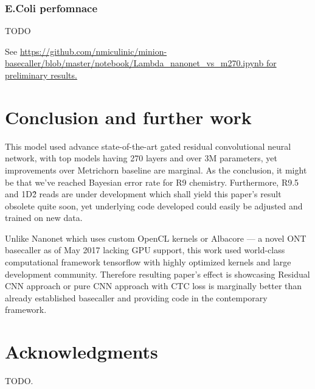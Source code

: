 \documentclass[times, utf8, seminar, numeric]{fer}
\begin{document}
\subsection{E.Coli perfomnace}

TODO

See \url{https://github.com/nmiculinic/minion-basecaller/blob/master/notebook/Lambda_nanonet_vs_m270.ipynb for preliminary results.}

\chapter{Conclusion and further work}

This model used advance state-of-the-art gated residual convolutional neural network, with top models having 270 layers and over 3M parameters, yet improvements over Metrichorn baseline are marginal. As the conclusion, it might be that we've reached Bayesian error rate for R9 chemistry. Furthermore, R9.5 and 1D\^2 reads are under development which shall yield this paper's result obsolete quite soon, yet underlying code developed could easily be adjusted and trained on new data.

Unlike Nanonet which uses custom OpenCL kernels or Albacore --- a novel ONT basecaller as of May 2017 lacking GPU support, this work used world-class computational framework tensorflow with highly optimized kernels and large development community. Therefore resulting paper's effect is showcasing Residual CNN approach or pure CNN approach with CTC loss is marginally better than already established basecaller and providing code in the contemporary framework.

\chapter{Acknowledgments}

TODO.



\end{document}

